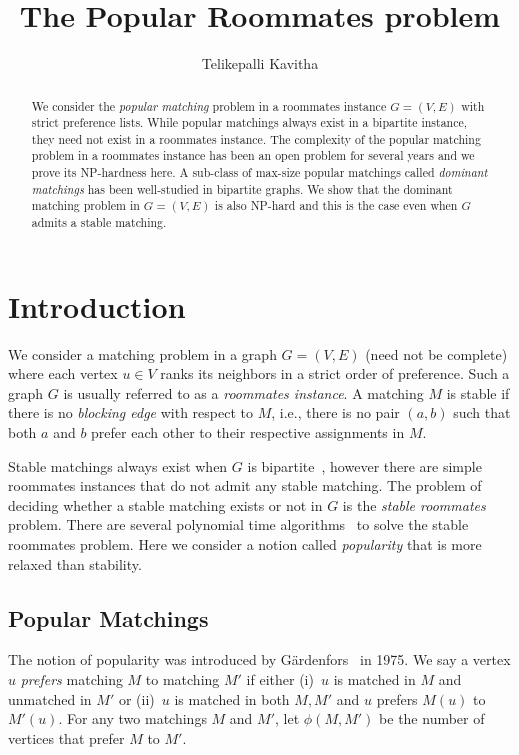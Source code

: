 \documentclass{llncs}
\begin{document}
\title{The Popular Roommates problem}
\author{Telikepalli Kavitha}
\maketitle
\pagestyle{plain}

\begin{abstract}
  We consider the {\em popular matching} problem in a roommates instance $G = (V,E)$ with strict preference lists. While popular matchings always
  exist in a bipartite instance, they need not exist in a roommates instance. The complexity of the popular matching problem in a roommates
  instance has been an open problem for several years and we prove its NP-hardness here.
  A sub-class of max-size popular matchings called {\em dominant matchings} has been well-studied in bipartite graphs. We show that 
  the dominant matching problem in $G = (V,E)$ is also NP-hard and this is the case even when $G$ admits a stable matching.
\end{abstract}


\section{Introduction}
\label{intro}
We consider a matching problem in a graph $G = (V,E)$ (need not be complete) where each vertex $u \in V$ ranks its neighbors in a strict order of preference. Such a
graph $G$ is usually referred to as a {\em roommates instance}. A matching $M$ is stable if there is no {\em blocking edge}
with respect to $M$, i.e., there is no pair $(a,b)$ such that both $a$ and $b$ prefer each other to their respective assignments in $M$.

Stable matchings always exist when $G$ is bipartite~\cite{GS62}, however there are simple roommates instances  that do not admit any stable matching.
The problem of deciding whether a stable matching exists or not in $G$ is  the {\em stable roommates} problem.
There are several polynomial time algorithms~\cite{Irv85,Sub94,TS98} to solve the stable roommates problem.
Here we consider a notion called {\em popularity} that is more relaxed than stability.


\subsection{Popular Matchings}
The notion of popularity was introduced by G\"ardenfors~\cite{Gar75} in 1975. 
We say a vertex $u$ {\em prefers} matching $M$ to matching $M'$ if either (i)~$u$ is matched in $M$
and unmatched in $M'$ or (ii)~$u$ is matched in both $M, M'$ and $u$ prefers $M(u)$ to $M'(u)$. 
For any two matchings $M$ and $M'$, let $\phi(M,M')$ be the number of vertices that prefer $M$ to $M'$.
\end{document}
